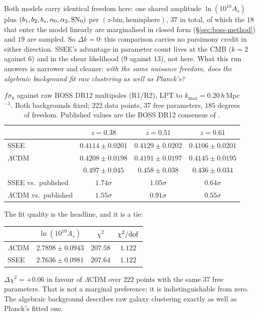 \documentclass[12pt,a4paper]{article}
\newcommand{\SSEE}{\textsc{SSEE}}
\begin{document}
Both models carry identical freedom here: one shared amplitude
$\ln(10^{10}A_s)$ plus $(b_1,b_2,b_s,\alpha_0,\alpha_2,{\rm SN_0})$ per
$(z\text{-bin},\text{hemisphere})$, $37$ in total, of which the $18$ that
enter the model linearly are marginalised in closed form
(\S\ref{sec:boss-method}) and $19$ are sampled. So $\Delta k=0$: this
comparison carries no parsimony credit in either direction. \SSEE{}'s
advantage in parameter count lives at the CMB ($k=2$ against $6$) and in the
shear likelihood ($9$ against $13$), not here. What this run answers is
narrower and cleaner: \emph{with the same nuisance freedom, does the algebraic
background fit raw clustering as well as Planck's?}

\begin{table}[h]
\centering
\caption{$f\sigma_8$ against raw BOSS DR12 multipoles (R1/R2), LPT to
$k_{\max}=0.20\,h\,$Mpc$^{-1}$. Both backgrounds fixed; $222$ data points,
$37$ free parameters, $185$ degrees of freedom. Published values are the
BOSS DR12 consensus of \citet{Alam2017}.}
\label{tab:fsigma8}
\begin{tabular}{lccc}
\toprule
 & $z=0.38$ & $z=0.51$ & $z=0.61$ \\
\midrule
\SSEE{}                    & $0.4114\pm0.0201$ & $0.4129\pm0.0202$ & $0.4106\pm0.0201$ \\
$\Lambda$CDM               & $0.4208\pm0.0198$ & $0.4191\pm0.0197$ & $0.4145\pm0.0195$ \\
\citet{Alam2017}           & $0.497\pm0.045$   & $0.458\pm0.038$   & $0.436\pm0.034$ \\
\midrule
\SSEE{} vs.\ published     & $1.74\sigma$ & $1.05\sigma$ & $0.64\sigma$ \\
$\Lambda$CDM vs.\ published& $1.55\sigma$ & $0.91\sigma$ & $0.55\sigma$ \\
\bottomrule
\end{tabular}
\end{table}

The fit quality is the headline, and it is a tie:
\begin{center}
\begin{tabular}{lccc}
\toprule
 & $\ln(10^{10}A_s)$ & $\chi^2$ & $\chi^2/{\rm dof}$ \\
\midrule
$\Lambda$CDM & $2.7898\pm0.0943$ & $207.58$ & $1.122$ \\
\SSEE{}      & $2.7636\pm0.0981$ & $207.64$ & $1.122$ \\
\bottomrule
\end{tabular}
\end{center}
$\Delta\chi^2 = +0.06$ in favour of $\Lambda$CDM over $222$ points with the
same $37$ free parameters. That is not a marginal preference; it is
indistinguishable from zero. The algebraic background describes raw galaxy
clustering exactly as well as Planck's fitted one.
\end{document}
